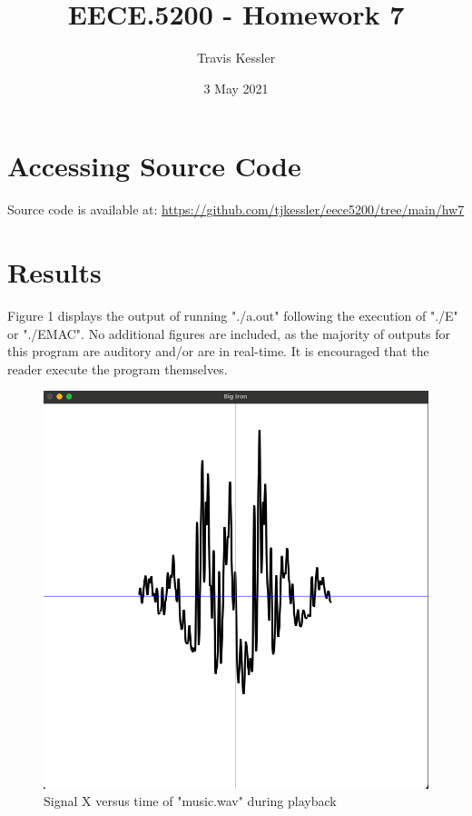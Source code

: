 \documentclass{report}
\title{EECE.5200 - Homework 7}
\author{Travis Kessler}
\date{3 May 2021}
\begin{document}
	\maketitle
	\newpage

	\lstset{frame=lines}

	\section*{Accessing Source Code}
	
	Source code is available at: \href{https://github.com/tjkessler/eece5200/tree/main/hw7}{https://github.com/tjkessler/eece5200/tree/main/hw7}

	\textit{}

	\section*{Results}
	
	Figure 1 displays the output of running "./a.out" following the execution of "./E" or "./EMAC". No additional figures are included, as the majority of outputs for this program are auditory and/or are in real-time. It is encouraged that the reader execute the program themselves.
	
	\begin{figure}[!ht]
		\centering
		\includegraphics[scale=0.5, trim={0 0.05cm 0 0.0cm}, clip]{figures/res.png}
		\caption{Signal X versus time of "music.wav" during playback}
	\end{figure}
\end{document}
